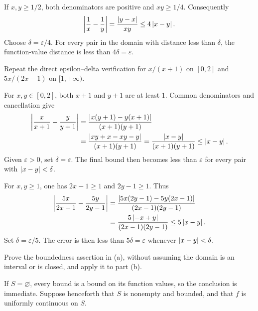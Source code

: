 \step{(c) The reciprocal on $[1/2,+\infty)$.}
If $x,y\ge1/2$, both denominators are positive and
$xy\ge1/4$. Consequently
\[
 \left|\frac1x-\frac1y\right|
 =\frac{\left|y-x\right|}{xy}\le4\left|x-y\right|.
\]
Choose $\delta=\varepsilon/4$. For every pair in the domain
with distance less than $\delta$, the function-value distance is
less than $4\delta=\varepsilon$.

\goal Repeat the direct epsilon--delta verification for
$x/(x+1)$ on $[0,2]$ and $5x/(2x-1)$ on $[1,+\infty)$.

For $x,y\in[0,2]$, both $x+1$ and $y+1$ are at least $1$.
Common denominators and cancellation give
\[
 \begin{aligned}
 \left|\frac{x}{x+1}-\frac{y}{y+1}\right|
 &=\frac{\left|x(y+1)-y(x+1)\right|}{(x+1)(y+1)}\\
 &=\frac{\left|xy+x-xy-y\right|}{(x+1)(y+1)}
 =\frac{\left|x-y\right|}{(x+1)(y+1)}\le\left|x-y\right|.
 \end{aligned}
\]
Given $\varepsilon>0$, set $\delta=\varepsilon$. The final bound
then becomes less than $\varepsilon$ for every pair with
$\left|x-y\right|<\delta$.

For $x,y\ge1$, one has $2x-1\ge1$ and $2y-1\ge1$.
Thus
\[
 \begin{aligned}
 \left|\frac{5x}{2x-1}-\frac{5y}{2y-1}\right|
 &=\frac{\left|5x(2y-1)-5y(2x-1)\right|}{(2x-1)(2y-1)}\\
 &=\frac{5\left|-x+y\right|}{(2x-1)(2y-1)}
 \le5\left|x-y\right|.
 \end{aligned}
\]
Set $\delta=\varepsilon/5$. The error is then less than
$5\delta=\varepsilon$ whenever $\left|x-y\right|<\delta$.

\goal Prove the boundedness assertion in (a), without assuming
the domain is an interval or is closed, and apply it to part (b).

If $S=\varnothing$, every bound is a bound on its function values,
so the conclusion is immediate. Suppose henceforth that $S$ is
nonempty and bounded, and that $f$ is uniformly continuous on $S$.

